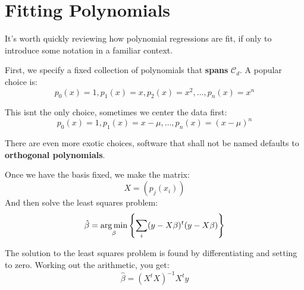 \section{Fitting Polynomials}
%
\begin{frame}
  It's worth quickly reviewing how polynomial regressions are fit, if only to
  introduce some notation in a familiar context.
\end{frame}
%
\begin{frame}
  First, we specify a fixed collection of polynomials that \textbf{spans}
  $\mathcal{C}_d$.  A popular choice is:
  $$ p_0(x) = 1, p_1(x) = x, p_2(x) = x^2, \ldots, p_n(x) = x^n $$
\end{frame}
%
\begin{frame}
  This isnt the only choice, sometimes we center the data first:
  $$ p_0(x) = 1, p_1(x) = x - \mu, \ldots, p_n(x) = (x - \mu)^n $$
\end{frame}
%
\begin{frame}
  There are even more exotic choices, software that shall not be named defaults
  to \textbf{orthogonal polynomials}.
\end{frame}
%
\begin{frame}
  Once we have the basis fixed, we make the matrix:
  $$ X = \left( p_j(x_i) \right) $$
  And then solve the least squares problem:
  $$ \hat{\beta} = \operatorname*{arg\,min}_{\beta} \left\{ \sum_i (y - X \beta)^t (y - X \beta)
  \right\} $$
\end{frame}
%
\begin{frame}
  The solution to the least squares problem is found by differentiating and
  setting to zero.  Working out the arithmetic, you get:
  $$ \hat{\beta} = (X^t X)^{-1} X^t y  $$
\end{frame}
